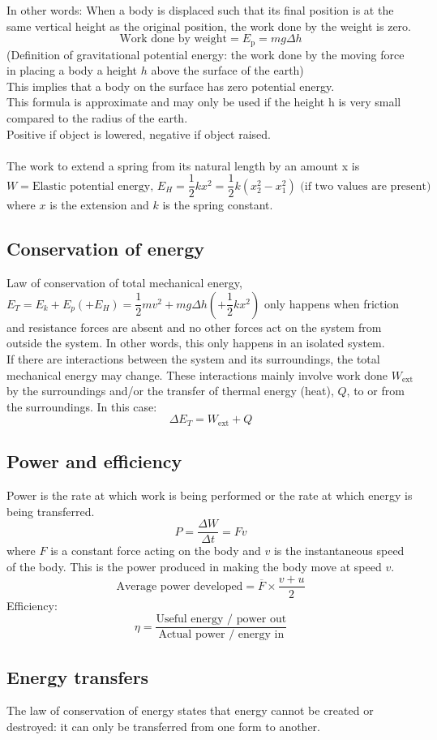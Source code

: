 \documentclass[a4paper,12pt]{article}
\begin{document}
In other words: When a body is displaced such that its final position is at the same vertical height as the original position, the work done by the weight is zero.
\[\text{Work done by weight}=E_\text{p}=mg\Delta h\]
(Definition of gravitational potential energy: the work done by the moving force in placing a body a height $h$ above the surface of the earth)\\
This implies that a body on the surface has zero potential energy.\\
This formula is approximate and may only be used if the height h is very small compared to the radius of the earth.\\
Positive if object is lowered, negative if object raised.\\\\
The work to extend a spring from its natural length by an amount x is
\[W=\text{Elastic potential energy, } E_H=\dfrac{1}{2}kx^2=\dfrac{1}{2}k(x_2^2-x_1^2) \text{ (if two values are present)}\]
where $x$ is the extension and $k$ is the spring constant.
\subsection{Conservation of energy}
Law of conservation of total mechanical energy, $E_T=E_k+E_p(+E_H)=\dfrac{1}{2}mv^2+mg\Delta h\left(+\dfrac{1}{2}kx^2\right)$ only happens when friction and resistance forces are absent and no other forces act on the system from outside the system. In other words, this only happens in an isolated system.\\
If there are interactions between the system and its surroundings, the total mechanical energy may change. These interactions mainly involve work done $W_\text{ext}$ by the surroundings and/or the transfer of thermal energy (heat), $Q$, to or from the surroundings. In this case:
\[\Delta E_T=W_\text{ext} + Q\]
\subsection{Power and efficiency}
Power is the rate at which work is being performed or the rate at which energy is being transferred.
\[P=\dfrac{\Delta W}{\Delta t}=Fv\]
where $F$ is a constant force acting on the body and $v$ is the instantaneous speed of the body. This is the power produced in making the body move at speed $v$.
\[\text{Average power developed}=\overline{F}\times\dfrac{v+u}{2}\]
Efficiency:
\[\eta=\dfrac{\text{Useful energy / power out}}{\text{Actual power / energy in}}\]
\subsection{Energy transfers}
The law of conservation of energy states that energy cannot be created or destroyed: it can only be transferred from one form to another.
\end{document}
